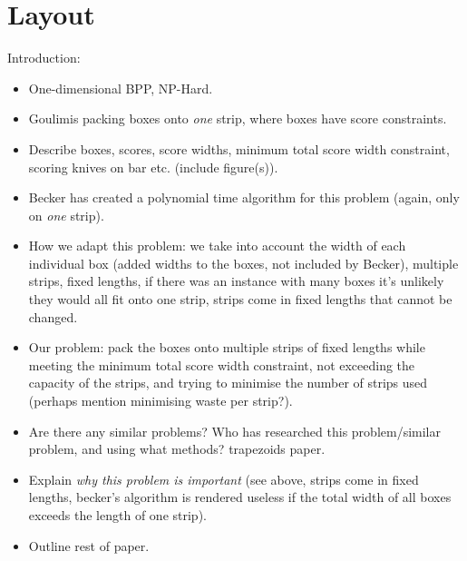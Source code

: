 \documentclass{llncs}
\begin{document}
\section{Layout}
Introduction:
\begin{itemize}
	\item One-dimensional BPP, NP-Hard.
	\item Goulimis packing boxes onto \textit{one} strip, where boxes have score constraints.
	\item Describe boxes, scores, score widths, minimum total score width constraint, scoring knives on bar etc. (include figure(s)).
	\item Becker has created a polynomial time algorithm for this problem (again, only on \textit{one} strip).
	\item How we adapt this problem: we take into account the width of each individual box (added widths to the boxes, not included by Becker), multiple strips, fixed lengths, if there was an instance with many boxes it's unlikely they would all fit onto one strip, strips come in fixed lengths that cannot be changed.
	\item Our problem: pack the boxes onto multiple strips of fixed lengths while meeting the minimum total score width constraint, not exceeding the capacity of the strips, and trying to minimise the number of strips used (perhaps mention minimising waste per strip?).
	\item Are there any similar problems? Who has researched this problem/similar problem, and using what methods? \cite{lewis2017} trapezoids paper. 
	\item Explain \textit{why this problem is important} (see above, strips come in fixed lengths, becker's algorithm is rendered useless if the total width of all boxes exceeds the length of one strip).
	\item Outline rest of paper.	
\end{itemize}
\end{document}
